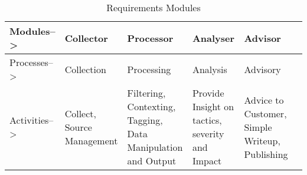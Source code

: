 
\begin{table}[htbp!]
   \setlength{\arrayrulewidth}{0.2mm}
    \setlength{\tabcolsep}{5pt}
    \renewcommand{\arraystretch}{1.0}

    \centering{}
 
    \caption{Requirements Modules}
    \label{table:Modules}
    
    \begin{tabularx}{0.92\linewidth}{|X| X|X|X|X|X|} 
    
     \arrayrulecolor[HTML]{06000A}
       
        \hline
         \rowcolor[HTML]{BFCEED} \textbf{Modules-->}	&	\textbf{Collector}	&	\textbf{Processor}	&	\textbf{Analyser}	&	\textbf{Advisor}\\
        \hline
        \rowcolor[HTML]{EAEAFC}  Processes--> &	Collection &	Processing &	Analysis &	Advisory  \\
        \hline
       
       \rowcolor[HTML]{F6F6FB} Activities--> &	Collect, Source Management & Filtering, Contexting, Tagging, Data Manipulation and Output &	Provide Insight on tactics, severity and Impact &	Advice to Customer, Simple Writeup, Publishing                                  \\
       
        \hline
    \end{tabularx}

\end{table}















%  
%
 

